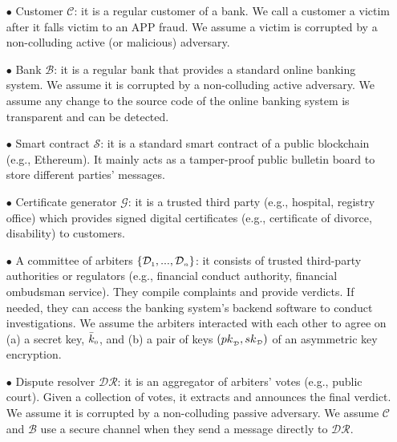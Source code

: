 \begin{itemize}
%
\item[$\bullet$] Customer $\mathcal{C}$: it is a regular customer of a bank. We call a customer  a victim after it falls victim to an APP fraud. We assume a victim is corrupted by a non-colluding active (or malicious) adversary. %
%
\item[$\bullet$] Bank $\mathcal{B}$: it is a regular bank that provides a standard online banking system. We assume it is corrupted by a non-colluding active adversary. We assume  any change to the source code of the online banking system is transparent and  can be detected. 


%
\item[$\bullet$] Smart contract $\mathcal{S}$: it is a standard  smart contract of a public  blockchain (e.g., Ethereum). It mainly acts as a tamper-proof public bulletin board to store different parties' messages.  %
%
\item[$\bullet$] Certificate generator $\mathcal{G}$: it is a trusted third party (e.g., hospital, registry office) which provides signed digital certificates (e.g., certificate of   divorce, disability) to customers. %
%
\item[$\bullet$]  A committee of arbiters $\{\mathcal{D}_{\scriptscriptstyle 1},..., \mathcal{D}_{\scriptscriptstyle n}\}$: it consists of  trusted third-party authorities or regulators (e.g.,  financial conduct authority, financial ombudsman service). They compile  complaints    and provide    verdicts. If needed, they can access the banking  system's backend software to conduct  investigations. We assume the arbiters  interacted with each other   to agree on (a) a secret key, $\bar k_{\scriptscriptstyle 0}$, and (b) a pair of keys $({pk}_{\scriptscriptstyle\mathcal {D}}, {sk}_{\scriptscriptstyle\mathcal {D}})$  of an asymmetric key encryption.
%
\item[$\bullet$]  Dispute resolver $\mathcal{DR}$: it is an aggregator of arbiters' votes (e.g., public court). Given a collection of votes, it extracts and announces the final verdict. We assume it is corrupted by a non-colluding passive adversary. We assume $\mathcal C$ and $\mathcal B$  use a secure channel when they  send a message directly to $\mathcal{DR}$. 
%
\end{itemize}



